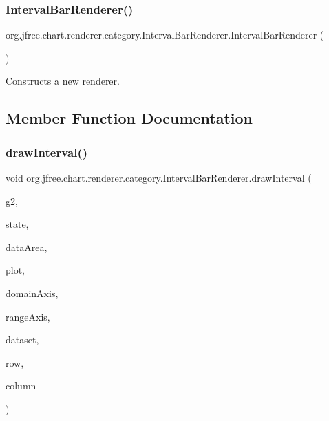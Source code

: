 \subsubsection{\texorpdfstring{Interval\+Bar\+Renderer()}{IntervalBarRenderer()}}
{\footnotesize\ttfamily org.\+jfree.\+chart.\+renderer.\+category.\+Interval\+Bar\+Renderer.\+Interval\+Bar\+Renderer (\begin{DoxyParamCaption}{ }\end{DoxyParamCaption})}

Constructs a new renderer. 

\subsection{Member Function Documentation}
\mbox{\label{classorg_1_1jfree_1_1chart_1_1renderer_1_1category_1_1_interval_bar_renderer_a4dc83197bd4843469565ff886cd7edeb}} 
\subsubsection{\texorpdfstring{draw\+Interval()}{drawInterval()}}
{\footnotesize\ttfamily void org.\+jfree.\+chart.\+renderer.\+category.\+Interval\+Bar\+Renderer.\+draw\+Interval (\begin{DoxyParamCaption}\item[{Graphics2D}]{g2,  }\item[{\mbox{\hyperlink{classorg_1_1jfree_1_1chart_1_1renderer_1_1category_1_1_category_item_renderer_state}{Category\+Item\+Renderer\+State}}}]{state,  }\item[{Rectangle2D}]{data\+Area,  }\item[{\mbox{\hyperlink{classorg_1_1jfree_1_1chart_1_1plot_1_1_category_plot}{Category\+Plot}}}]{plot,  }\item[{\mbox{\hyperlink{classorg_1_1jfree_1_1chart_1_1axis_1_1_category_axis}{Category\+Axis}}}]{domain\+Axis,  }\item[{\mbox{\hyperlink{classorg_1_1jfree_1_1chart_1_1axis_1_1_value_axis}{Value\+Axis}}}]{range\+Axis,  }\item[{\mbox{\hyperlink{interfaceorg_1_1jfree_1_1data_1_1category_1_1_interval_category_dataset}{Interval\+Category\+Dataset}}}]{dataset,  }\item[{int}]{row,  }\item[{int}]{column }\end{DoxyParamCaption})\hspace{0.3cm}{\ttfamily [protected]}}

